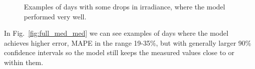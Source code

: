 \begin{figure}[ht!]
    \caption{Examples of days with some drops in irradiance, where the model performed very well.
    \label{fig:full_med_best}}
\end{figure}

In Fig.~\ref{fig:full_med_med} we can see examples of days where the model achieves higher error, MAPE in the range 19-35\%, but with generally larger 90\% confidence intervals so the model still keeps the measured values close to or within them.
\begin{figure}[ht!]
    \centering
    \qquad
    \qquad
    \qquad

\end{figure}
